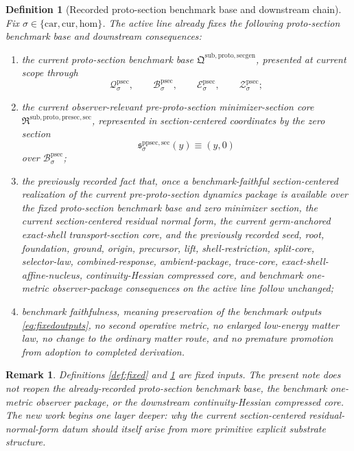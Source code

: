 \documentclass[11pt]{article}
\newcommand{\Car}{\mathrm{car}}
\newcommand{\Cur}{\mathrm{cur}}
\newcommand{\Hom}{\mathrm{hom}}
\newcommand{\ProtoSectionPackage}{\mathfrak Q^{\mathrm{sub,proto,secgen}}}
\newcommand{\ProtoSectionState}[1]{\mathcal Q_{#1}^{\mathrm{psec}}}
\newcommand{\ProtoSectionBody}[1]{\mathcal B_{#1}^{\mathrm{psec}}}
\newcommand{\ProtoSectionFunctional}[1]{\mathscr E_{#1}^{\mathrm{psec}}}
\newcommand{\ProtoSectionShell}[1]{\mathcal Z_{#1}^{\mathrm{psec}}}
\newcommand{\PreProtoSectionMinSectionCore}{\mathfrak R^{\mathrm{sub,proto,presec,sec}}}
\newcommand{\PreProtoSectionMinSection}[1]{\mathfrak s_{#1}^{\mathrm{ppsec,sec}}}
\newtheorem{definition}{Definition}
\newtheorem{remark}{Remark}
\begin{document}
\begin{definition}[Recorded proto-section benchmark base and downstream chain]
\label{def:downstream}
Fix \(\sigma\in\{\Car,\Cur,\Hom\}\). The active line already fixes the following proto-section benchmark base and downstream consequences:
\begin{enumerate}
    \item the current proto-section benchmark base \(\ProtoSectionPackage\), presented at current scope through
    \[
    \ProtoSectionState{\sigma},\qquad
    \ProtoSectionBody{\sigma},\qquad
    \ProtoSectionFunctional{\sigma},\qquad
    \ProtoSectionShell{\sigma};
    \]
    \item the current observer-relevant pre-proto-section minimizer-section core \(\PreProtoSectionMinSectionCore\), represented in section-centered coordinates by the zero section
    \[
    \PreProtoSectionMinSection{\sigma}(y)\equiv (y,0)
    \]
    over \(\ProtoSectionBody{\sigma}\);
    \item the previously recorded fact that, once a benchmark-faithful section-centered realization of the current pre-proto-section dynamics package is available over the fixed proto-section benchmark base and zero minimizer section, the current section-centered residual normal form, the current germ-anchored exact-shell transport-section core, and the previously recorded seed, root, foundation, ground, origin, precursor, lift, shell-restriction, split-core, selector-law, combined-response, ambient-package, trace-core, exact-shell-affine-nucleus, continuity-Hessian compressed core, and benchmark one-metric observer-package consequences on the active line follow unchanged;
    \item benchmark faithfulness, meaning preservation of the benchmark outputs \eqref{eq:fixedoutputs}, no second operative metric, no enlarged low-energy matter law, no change to the ordinary matter route, and no premature promotion from adoption to completed derivation.
\end{enumerate}
\end{definition}

\begin{remark}
Definitions \ref{def:fixed} and \ref{def:downstream} are fixed inputs. The present note does not reopen the already-recorded proto-section benchmark base, the benchmark one-metric observer package, or the downstream continuity-Hessian compressed core. The new work begins one layer deeper: why the current section-centered residual-normal-form datum should itself arise from more primitive explicit substrate structure.
\end{remark}
\end{document}
